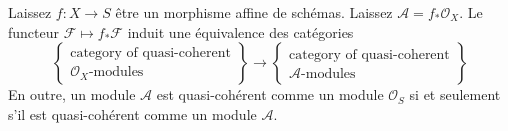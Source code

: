 \begin{lemma}

\label{lemma-affine-equivalence-modules}
Laissez $f : X \to S$ être un morphisme affine de schémas. Laissez $\mathcal{A} = f_*\mathcal{O}_X$. Le functeur $\mathcal{F} \mapsto f_*\mathcal{F}$ induit une équivalence des catégories $$
\left\{
\begin{matrix}
\text{category of quasi-coherent}\\
\mathcal{O}_X\text{-modules}
\end{matrix}
\right\}
\longrightarrow
\left\{
\begin{matrix}
\text{category of quasi-coherent}\\
\mathcal{A}\text{-modules}
\end{matrix}
\right\}
$$ En outre, un module $\mathcal{A}$ est quasi-cohérent comme un module $\mathcal{O}_S$ si et seulement s'il est quasi-cohérent comme un module $\mathcal{A}$.
\end{lemma}


